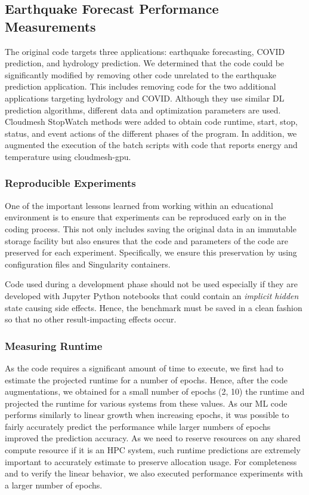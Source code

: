 \subsection{Earthquake Forecast Performance Measurements}
\label{sec:perf-main}

The original code targets three applications: earthquake forecasting, COVID prediction, and hydrology prediction. We determined that the code could be significantly modified by removing other code unrelated to the earthquake prediction application. This includes removing code for the two additional applications targeting hydrology and COVID. Although they use similar DL prediction algorithms, different data and optimization parameters are used. Cloudmesh StopWatch methods were added to obtain code runtime, start, stop, status, and event actions of the different phases of the program. In addition, we augmented the execution of the batch scripts with code that reports energy and temperature using cloudmesh-gpu.


\subsubsection{Reproducible Experiments}

One of the important lessons learned from working within an educational environment is to ensure that experiments can be reproduced early on in the coding process. This not only includes saving the original data in an immutable storage facility but also ensures that the code and parameters of the code are preserved for each experiment. Specifically, we ensure this preservation by using configuration files and Singularity containers. 

Code used during a development phase should not be used especially if they are developed with Jupyter Python notebooks that could contain an {\em implicit
  hidden} state causing side effects. Hence, the benchmark 
must be saved in a clean fashion so that no other result-impacting
effects occur.

\subsubsection{Measuring Runtime}
\label{sec:perf-runtime}

As the code requires a significant amount of time to execute, we first had to estimate the projected runtime for a number of epochs. Hence, after the code augmentations, we obtained for a small number of epochs (2, 10) the runtime and projected the runtime for various systems from these values.  As our ML code performs similarly to linear growth when increasing epochs, it was possible to fairly accurately predict the performance while larger numbers of epochs improved the prediction accuracy. As we need to reserve resources on any shared compute resource if it is an HPC system, such runtime predictions are extremely important to accurately estimate to preserve allocation usage. For completeness and to verify the linear behavior, we also executed performance experiments with a larger number of epochs.

